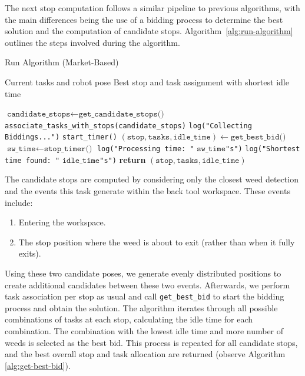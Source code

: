 The next stop computation follows a similar pipeline to previous algorithms, with the main differences being the use of a bidding process to determine the best solution and the computation of candidate stops. Algorithm~\ref{alg:run-algorithm} outlines the steps involved during the algorithm.

\begin{algorithm}
    \caption{Run Algorithm (Market-Based)}
    \label{alg:run-algorithm}
    \begin{algorithmic}[1]
    \REQUIRE Current tasks and robot pose
    \ENSURE Best stop and task assignment with shortest idle time
    
    \STATE $\texttt{candidate\_stops} \gets \texttt{get\_candidate\_stops()}$
    \STATE \texttt{associate\_tasks\_with\_stops(candidate\_stops)}
        \STATE \texttt{log("Collecting Biddings...")}
    \ENDIF
    \STATE \texttt{start\_timer()}
    \STATE $(\texttt{stop}, \texttt{tasks}, \texttt{idle\_time}) \gets \texttt{get\_best\_bid()}$
    \STATE $\texttt{sw\_time} \gets \texttt{stop\_timer()}$
        \STATE \texttt{log("Processing time: "} $\texttt{sw\_time}$\texttt{"s")}
        \STATE \texttt{log("Shortest time found: "} $\texttt{idle\_time}$\texttt{"s")}
    \ENDIF
    \STATE \textbf{return} $(\texttt{stop}, \texttt{tasks}, \texttt{idle\_time})$
    \end{algorithmic}
\end{algorithm}
    
The candidate stops are computed by considering only the closest weed detection and the events this task generate within the back tool workspace. These events include:

\begin{enumerate}
    \item Entering the workspace.
    \item The stop position where the weed is about to exit (rather than when it fully exits).
\end{enumerate}

Using these two candidate poses, we generate evenly distributed positions to create additional candidates between these two events. Afterwards, we perform task association per stop as usual and call \texttt{get\_best\_bid} to start the bidding process and obtain the solution. The algorithm iterates through all possible combinations of tasks at each stop, calculating the idle time for each combination. The combination with the lowest idle time and more number of weeds is selected as the best bid. This process is repeated for all candidate stops, and the best overall stop and task allocation are returned (observe Algorithm \ref{alg:get-best-bid}).

